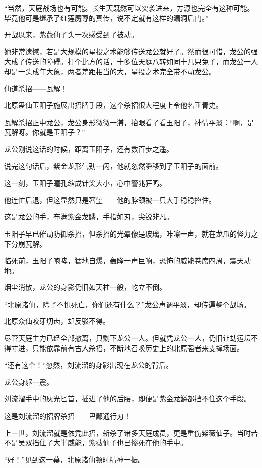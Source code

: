 \begin{this_body}
“当然，天庭战场也有可能。长生天既然可以突袭进来，方源也完全有这种可能。毕竟他可是继承了红莲魔尊的真传，说不定就有这样的漏洞后门。”

开战以来，紫薇仙子头一次感受到了被动。

她非常遗憾，若是大规模的星投之术能够传送龙公就好了。然而很可惜，龙公的强大成了传送的障碍。打个比方的话，十多位天庭八转如同十几只兔子，而龙公一人却是一头成年大象，两者差距相当的大，星投之术完全带不动龙公。

仙道杀招——瓦解！

北原蛊仙玉阳子施展出招牌手段，这个杀招很大程度上令他名垂青史。

瓦解杀招正中龙公，龙公身形微微一滞，抬眼看了看玉阳子，神情平淡：“啊，是瓦解呀。你就是玉阳子？”

龙公刚说这话的时候，距离玉阳子，还有数百步之遥。

说完这句话后，紫金龙形气劲一闪，他就忽然瞬移到了玉阳子的面前。

这一刻，玉阳子瞳孔缩成针尖大小，心中警兆狂鸣。

他连忙后退，但这显然只是奢望——他的脖颈被一只大手稳稳掐住。

这是龙公的手，布满紫金龙鳞，手指如刃，尖锐非凡。

玉阳子早已催动防御杀招，但杀招的光晕像是玻璃，咔嚓一声，就在龙爪的怪力之下分崩瓦解。

临死前，玉阳子咆哮，猛地自爆，轰隆一声巨响，恐怖的威能卷席四周，震天动地。

烟尘消散，龙公的身影仍旧如天柱一般，屹立不倒。

“北原诸仙，除了不惧死亡，你们还有什么？”龙公声调平淡，却传遍整个战场。

北原众仙咬牙切齿，却反驳不得。

尽管天庭主力已经全部撤离，只剩下龙公一人。但就凭龙公一人，仍旧让劫运坛不得寸进，只能依靠前有古人杀招，不断地召唤历史上的北原强者来支撑场面。

“还有这个！”忽然，刘流溜的身影出现在龙公的背后。

龙公身躯一震。

刘流溜手中的灰光匕首，插进了他的后腰，即便是紫金龙鳞都挡不住这个手段。

这是刘流溜的招牌杀招——卑鄙通行刃！

上一世，刘流溜就是依凭此招，斩杀了诸多天庭成员，更是重伤紫薇仙子。当时若不是吴双挡住了大半威能，紫薇仙子也已惨死在他的手中。

“好！”见到这一幕，北原诸仙顿时精神一振。


\end{this_body}
